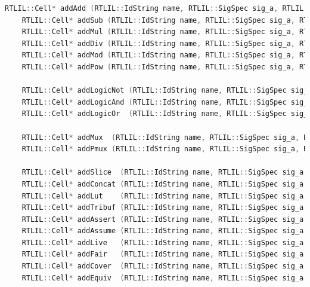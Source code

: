 \documentclass[11pt]{report}
\begin{document}
\begin{lstlisting}[language=C++]
	RTLIL::Cell* addAdd (RTLIL::IdString name, RTLIL::SigSpec sig_a, RTLIL::SigSpec sig_b, RTLIL::SigSpec sig_y, bool is_signed = false, const std::string &src = "");
	RTLIL::Cell* addSub (RTLIL::IdString name, RTLIL::SigSpec sig_a, RTLIL::SigSpec sig_b, RTLIL::SigSpec sig_y, bool is_signed = false, const std::string &src = "");
	RTLIL::Cell* addMul (RTLIL::IdString name, RTLIL::SigSpec sig_a, RTLIL::SigSpec sig_b, RTLIL::SigSpec sig_y, bool is_signed = false, const std::string &src = "");
	RTLIL::Cell* addDiv (RTLIL::IdString name, RTLIL::SigSpec sig_a, RTLIL::SigSpec sig_b, RTLIL::SigSpec sig_y, bool is_signed = false, const std::string &src = "");
	RTLIL::Cell* addMod (RTLIL::IdString name, RTLIL::SigSpec sig_a, RTLIL::SigSpec sig_b, RTLIL::SigSpec sig_y, bool is_signed = false, const std::string &src = "");
	RTLIL::Cell* addPow (RTLIL::IdString name, RTLIL::SigSpec sig_a, RTLIL::SigSpec sig_b, RTLIL::SigSpec sig_y, bool a_signed = false, bool b_signed = false, const std::string &src = "");

	RTLIL::Cell* addLogicNot (RTLIL::IdString name, RTLIL::SigSpec sig_a, RTLIL::SigSpec sig_y, bool is_signed = false, const std::string &src = "");
	RTLIL::Cell* addLogicAnd (RTLIL::IdString name, RTLIL::SigSpec sig_a, RTLIL::SigSpec sig_b, RTLIL::SigSpec sig_y, bool is_signed = false, const std::string &src = "");
	RTLIL::Cell* addLogicOr  (RTLIL::IdString name, RTLIL::SigSpec sig_a, RTLIL::SigSpec sig_b, RTLIL::SigSpec sig_y, bool is_signed = false, const std::string &src = "");

	RTLIL::Cell* addMux  (RTLIL::IdString name, RTLIL::SigSpec sig_a, RTLIL::SigSpec sig_b, RTLIL::SigSpec sig_s, RTLIL::SigSpec sig_y, const std::string &src = "");
	RTLIL::Cell* addPmux (RTLIL::IdString name, RTLIL::SigSpec sig_a, RTLIL::SigSpec sig_b, RTLIL::SigSpec sig_s, RTLIL::SigSpec sig_y, const std::string &src = "");

	RTLIL::Cell* addSlice  (RTLIL::IdString name, RTLIL::SigSpec sig_a, RTLIL::SigSpec sig_y, RTLIL::Const offset, const std::string &src = "");
	RTLIL::Cell* addConcat (RTLIL::IdString name, RTLIL::SigSpec sig_a, RTLIL::SigSpec sig_b, RTLIL::SigSpec sig_y, const std::string &src = "");
	RTLIL::Cell* addLut    (RTLIL::IdString name, RTLIL::SigSpec sig_a, RTLIL::SigSpec sig_y, RTLIL::Const lut, const std::string &src = "");
	RTLIL::Cell* addTribuf (RTLIL::IdString name, RTLIL::SigSpec sig_a, RTLIL::SigSpec sig_en, RTLIL::SigSpec sig_y, const std::string &src = "");
	RTLIL::Cell* addAssert (RTLIL::IdString name, RTLIL::SigSpec sig_a, RTLIL::SigSpec sig_en, const std::string &src = "");
	RTLIL::Cell* addAssume (RTLIL::IdString name, RTLIL::SigSpec sig_a, RTLIL::SigSpec sig_en, const std::string &src = "");
	RTLIL::Cell* addLive   (RTLIL::IdString name, RTLIL::SigSpec sig_a, RTLIL::SigSpec sig_en, const std::string &src = "");
	RTLIL::Cell* addFair   (RTLIL::IdString name, RTLIL::SigSpec sig_a, RTLIL::SigSpec sig_en, const std::string &src = "");
	RTLIL::Cell* addCover  (RTLIL::IdString name, RTLIL::SigSpec sig_a, RTLIL::SigSpec sig_en, const std::string &src = "");
	RTLIL::Cell* addEquiv  (RTLIL::IdString name, RTLIL::SigSpec sig_a, RTLIL::SigSpec sig_b, RTLIL::SigSpec sig_y, const std::string &src = "");


\end{lstlisting}
\end{document}
